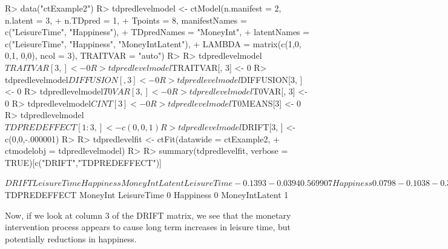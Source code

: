 \documentclass[nojss]{jss}\usepackage[]{graphicx}\usepackage[]{color}
\begin{document}
\begin{Schunk}
\begin{Sinput}
R> data("ctExample2")
R> tdpredlevelmodel <- ctModel(n.manifest = 2, n.latent = 3, 
+   n.TDpred = 1, 
+   Tpoints = 8, manifestNames = c("LeisureTime", "Happiness"), 
+   TDpredNames = "MoneyInt", 
+   latentNames = c("LeisureTime", "Happiness", "MoneyIntLatent"),
+   LAMBDA = matrix(c(1,0, 0,1, 0,0), ncol = 3), TRAITVAR = "auto")
R> 
R> tdpredlevelmodel$TRAITVAR[3, ] <- 0
R> tdpredlevelmodel$TRAITVAR[, 3] <- 0
R> tdpredlevelmodel$DIFFUSION[, 3] <- 0
R> tdpredlevelmodel$DIFFUSION[3, ] <- 0
R> tdpredlevelmodel$T0VAR[3, ] <- 0
R> tdpredlevelmodel$T0VAR[, 3] <- 0
R> tdpredlevelmodel$CINT[3] <- 0
R> tdpredlevelmodel$T0MEANS[3] <- 0
R> tdpredlevelmodel$TDPREDEFFECT[1:3, ] <- c(0,0,1)
R> tdpredlevelmodel$DRIFT[3, ] <- c(0,0,-.000001)
R> 
R> tdpredlevelfit <- ctFit(datawide = ctExample2, 
+   ctmodelobj = tdpredlevelmodel)
R> 
R> summary(tdpredlevelfit, verbose = TRUE)[c("DRIFT","TDPREDEFFECT")]
\end{Sinput}
\begin{Soutput}
$DRIFT
               LeisureTime Happiness MoneyIntLatent
LeisureTime        -0.1393   -0.0394       0.569907
Happiness           0.0798   -0.1038      -0.357674
MoneyIntLatent      0.0000    0.0000      -0.000001

$TDPREDEFFECT
               MoneyInt
LeisureTime           0
Happiness             0
MoneyIntLatent        1
\end{Soutput}
\end{Schunk}

Now, if we look at column 3 of the DRIFT matrix, we see that the monetary intervention process appears to cause long term increases in leisure time, but potentially reductions in happiness. 
\end{document}
